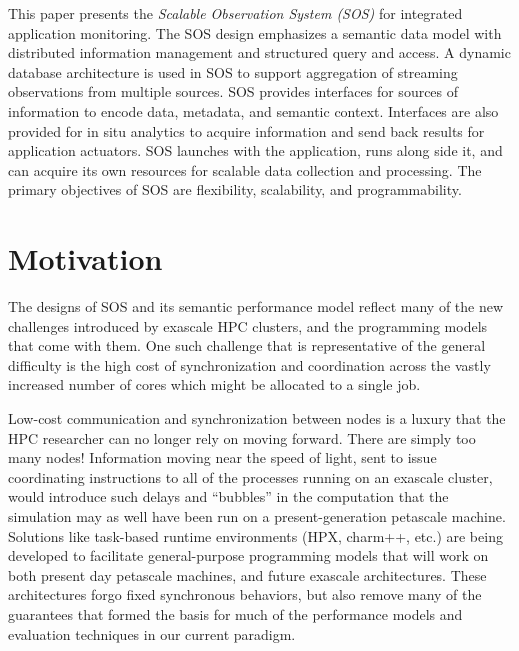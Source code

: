 This paper presents the \textit{Scalable Observation System (SOS)} for
integrated application monitoring.  The SOS design emphasizes a semantic
data model with distributed information management and structured query and
access.  A dynamic database architecture is used in SOS to support
aggregation of streaming observations from multiple sources.  SOS provides
interfaces for sources of information to encode data, metadata, and
semantic context.  Interfaces are also provided for in situ analytics to
acquire information and send back results for application actuators.  SOS
launches with the application, runs along side it, and can acquire its own
resources for scalable data collection and processing.  The primary
objectives of SOS are flexibility, scalability, and programmability.


\section{Motivation}

The designs of SOS and its semantic performance model reflect many of
the new challenges introduced by exascale HPC clusters, and the
programming models that come with them. One such challenge that is
representative of the general difficulty is the high cost of
synchronization and coordination across the vastly increased number of
cores which might be allocated to a single job.

Low-cost communication and synchronization between nodes is a luxury
that the HPC researcher can no longer rely on moving forward. There
are simply too many nodes! Information moving near the speed of light,
sent to issue coordinating instructions to all of the processes
running on an exascale cluster, would introduce such delays and
``bubbles'' in the computation that the simulation may as well have
been run on a present-generation petascale
machine.  Solutions like task-based runtime
environments (HPX, charm++, etc.)  are being developed to facilitate
general-purpose programming models that will work on both present day
petascale machines, and future exascale architectures. These
architectures forgo fixed synchronous behaviors, but also remove many
of the guarantees that formed the basis for much of the performance
models and evaluation techniques in our current paradigm.

